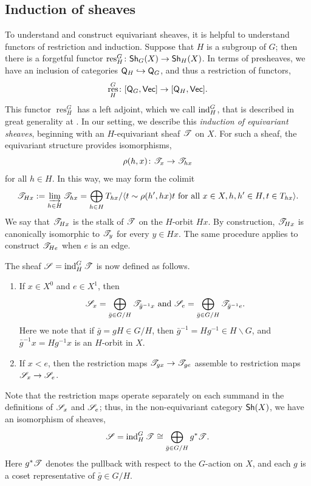 \documentclass[letter]{amsart}
\theoremstyle{definition}
\theoremstyle{remark}
\numberwithin{thm}{section}
\numberwithin{equation}{section}
\DeclareMathOperator{\res}{res}
\begin{document}
\subsection{Induction of sheaves}

To understand and construct equivariant sheaves, it is helpful to understand functors of restriction and induction.  Suppose that $H$ is a subgroup of $G$; then there is a forgetful functor $\res_H^G \From \Cat{Sh}_G(X) \To \Cat{Sh}_H(X)$.  In terms of presheaves, we have an inclusion of categories ${\mathsf{Q}}_H \hookrightarrow {\mathsf{Q}}_G$, and thus a restriction of functors,
$$\res_H^G \From [\Cat{Q}_G, \Cat{Vec}] \To [\Cat{Q}_H, \Cat{Vec}].$$
This functor $\res_H^G$ has a left adjoint, which we call $\operatorname{ind}_H^G$, that is described in great generality at \cite[\href{https://stacks.math.columbia.edu/tag/00VC}{Tag 00VC}]{stacks-project}.  In our setting, we describe this {\em induction of equivariant sheaves}, beginning with an $H$-equivariant sheaf ${\mathscr{T}}$ on $X$.  For such a sheaf, the equivariant structure provides isomorphisms,
$$\rho(h,x) \colon {\mathscr{T}}_x \rightarrow {\mathscr{T}}_{hx}$$
for all $h \in H$.  In this way, we may form the colimit
$${\mathscr{T}}_{Hx} := \varinjlim_{h \in H} {\mathscr{T}}_{hx} = \bigoplus_{h \in H} T_{hx} / \langle t \sim \rho(h',hx) t \text{ for all } x \in X, h,h' \in H, t \in T_{hx} \rangle.$$
We say that ${\mathscr{T}}_{Hx}$ is the stalk of ${\mathscr{T}}$ on the $H$-orbit $Hx$.  By construction, ${\mathscr{T}}_{Hx}$ is canonically isomorphic to ${\mathscr{T}}_y$ for every $y \in Hx$.  The same procedure applies to construct ${\mathscr{T}}_{He}$ when $e$ is an edge.  

The sheaf ${\mathscr{S}} = \operatorname{ind}_H^G {\mathscr{T}}$ is now defined as follows.
\begin{enumerate}
\item
If $x \in X^0$ and $e \in X^1$, then
$${\mathscr{S}}_x = \bigoplus_{\bar g \in G/H}  {\mathscr{T}}_{\bar g^{-1} x} \text{ and } {\mathscr{S}}_e = \bigoplus_{\bar g \in G/H}  {\mathscr{T}}_{\bar g^{-1} e}.$$
Here we note that if $\bar g = g H \in G/H$, then $\bar g^{-1} = H g^{-1} \in H \backslash G$, and $\bar g^{-1} x = H g^{-1} x$ is an $H$-orbit in $X$.
\item
If $x < e$, then the restriction maps ${\mathscr{T}}_{gx} \rightarrow {\mathscr{T}}_{ge}$ assemble to restriction maps ${\mathscr{S}}_x \rightarrow {\mathscr{S}}_e$.
\end{enumerate}

Note that the restriction maps operate separately on each summand in the definitions of ${\mathscr{S}}_x$ and ${\mathscr{S}}_e$; thus, in the non-equivariant category ${\mathsf{Sh}}(X)$, we have an isomorphism of sheaves,
\begin{equation}
\label{ind-sheaf}
{\mathscr{S}} = \operatorname{ind}_H^G {\mathscr{T}}  \cong \bigoplus_{\bar g \in G/H} g^\ast {\mathscr{T}}.
\end{equation}
Here $g^\ast {\mathscr{T}}$ denotes the pullback with respect to the $G$-action on $X$, and each $g$ is a coset representative of $\bar g \in G/H$.
\end{document}
